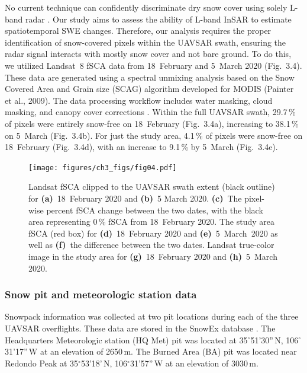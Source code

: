 No current technique can confidently discriminate dry snow cover using solely L-band radar \citep{tsaiRemoteSensingSnow2019}. Our study aims to assess the ability of L-band InSAR to estimate spatiotemporal SWE changes. Therefore, our analysis requires the proper identification of snow-covered pixels within the UAVSAR swath, ensuring the radar signal interacts with mostly snow cover and not bare ground. To do this, we utilized Landsat~8 fSCA \citep{u.s.geologicalsurveyearthresourcesobservationandsciencecenterCollection1LandsatLevel32018} data from 18~February and 5~March 2020 (Fig.~3.4). These data are generated using a spectral unmixing analysis based on the Snow Covered Area and Grain size (SCAG) algorithm developed for MODIS (Painter et al., 2009). The data processing workflow includes water masking, cloud masking, and canopy cover corrections \citep{selkowitzUSGSLandsatSnow2017, stillingerLandsatMODISVIIRS2023a}. Within the full UAVSAR swath, 29.7\,\% of pixels were entirely snow-free on 18~February (Fig.~3.4a), increasing to 38.1\,\% on 5~March (Fig.~3.4b). For just the study area, 4.1\,\% of pixels were snow-free on 18~February (Fig.~3.4d), with an increase to 9.1\,\% by 5~March (Fig.~3.4e).

\begin{figure}[t]
\texttt{[image: figures/ch3\_figs/fig04.pdf]}
\caption{Landsat fSCA clipped to the UAVSAR swath extent (black outline) for \textbf{(a)}~18~February 2020 and \textbf{(b)}~5 March 2020. \textbf{(c)}~The pixel-wise percent fSCA change between the two dates, with the black area representing 0\,\% fSCA from 18~February 2020. The study area fSCA (red box) for \textbf{(d)}~18~February 2020 and \textbf{(e)}~5~March~2020 as well as \textbf{(f)}~the difference between the two dates. Landsat true-color image in the study area for \textbf{(g)}~18~February 2020 and \textbf{(h)}~5~March 2020.}
\end{figure}

\hypertarget{ch3-methods-8}{\subsubsection{Snow pit and meteorologic station data}\label{ch3-methods-8}}


Snowpack information was collected at two pit locations during each of the three UAVSAR overflights. These data are stored in the SnowEx database \citep{johnsonSnowExSnowexDb2023}. The Headquarters Meteorologic station (HQ Met) pit was located at 35$^{\circ}$51'30''\,N, 106$^{\circ}$31'17''\,W at an elevation of 2650\,m. The Burned Area (BA) pit was located near Redondo Peak at 35$^{\circ}$53'18'\,N, 106$^{\circ}$31'57''\,W at an elevation of 3030\,m.

